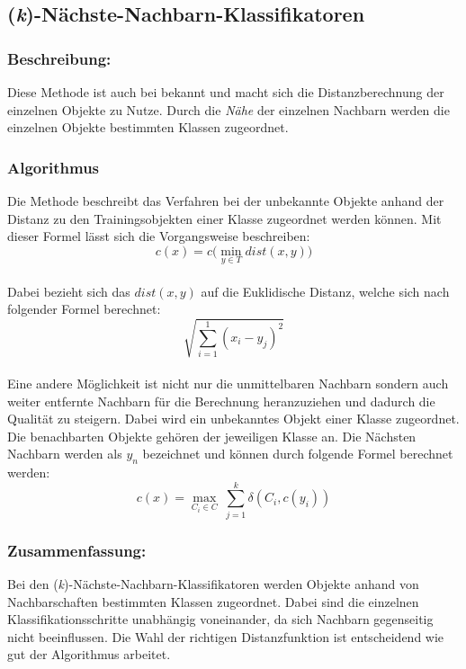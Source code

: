 \subsection{(\textit{k})-Nächste-Nachbarn-Klassifikatoren} 

\subsubsection{Beschreibung:}
Diese Methode ist auch bei  bekannt und macht sich die Distanzberechnung der einzelnen Objekte zu Nutze. Durch die \textit{Nähe} der einzelnen Nachbarn werden die einzelnen Objekte bestimmten Klassen zugeordnet. \cite{brei84, mitch97}

\subsubsection{Algorithmus}
Die Methode beschreibt das Verfahren bei der unbekannte Objekte anhand der Distanz zu den Trainingsobjekten einer Klasse zugeordnet werden können.
Mit dieser Formel lässt sich die Vorgangsweise beschreiben: \\


\[c(x) = c \bigg( \min\limits_{y \in T} dist(x,y) \bigg)\]\\

Dabei bezieht sich das \(dist(x,y) \) auf die Euklidische Distanz, welche sich nach folgender Formel berechnet: \[\sqrt{\displaystyle\sum_{i=1}^1 (x_i - y_j)^2}\] \\

Eine andere Möglichkeit ist nicht nur die unmittelbaren Nachbarn sondern auch weiter entfernte Nachbarn für die Berechnung heranzuziehen und dadurch die Qualität zu steigern. Dabei wird ein unbekanntes Objekt einer Klasse zugeordnet. Die benachbarten Objekte gehören der jeweiligen Klasse an. Die Nächsten Nachbarn werden als \(y_n\) bezeichnet und können durch folgende Formel berechnet werden:\\

\[c(x) = \max\limits_{C_i \in C}\ \displaystyle\sum_{j=1}^k \delta (C_i,c(y_i))\]
\cite{brei84, mitch97}
\subsubsection{Zusammenfassung:}
Bei den (\textit{k})-Nächste-Nachbarn-Klassifikatoren werden Objekte anhand von Nachbarschaften bestimmten Klassen zugeordnet. Dabei sind die einzelnen Klassifikationsschritte unabhängig voneinander, da sich Nachbarn gegenseitig nicht beeinflussen. Die Wahl der richtigen Distanzfunktion ist entscheidend wie gut der Algorithmus arbeitet. 
